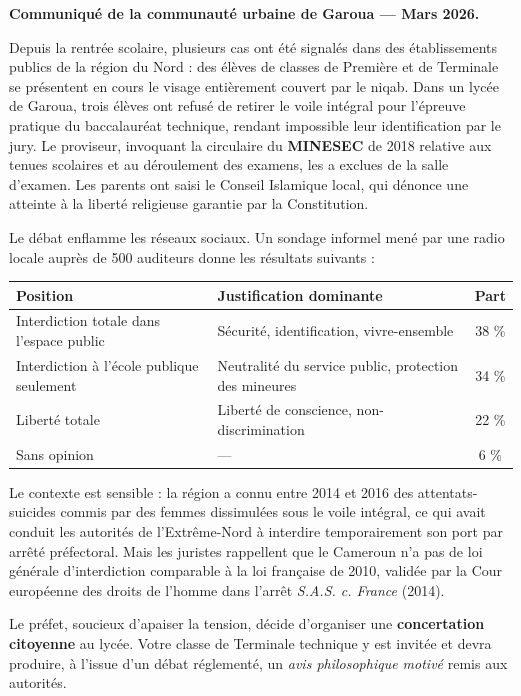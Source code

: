 \documentclass[11pt]{article}
\newcounter{popsec}
\newcounter{popsub}
\newcommand{\courssub}[1]{%
  \stepcounter{popsub}%
  \par\vspace{9pt}\noindent{\popxbold\fontsize{11.5}{13}\selectfont\color{popink}{\color{poporange}\thepopsec.\thepopsub}\hspace{6pt}#1}\par\nopagebreak\vspace{4pt}
}
\begin{document}
\courssub{Situation}

\textbf{Communiqué de la communauté urbaine de Garoua — Mars 2026.}

Depuis la rentrée scolaire, plusieurs cas ont été signalés dans des établissements publics de la région du Nord : des élèves de classes de Première et de Terminale se présentent en cours le visage entièrement couvert par le niqab. Dans un lycée de Garoua, trois élèves ont refusé de retirer le voile intégral pour l'épreuve pratique du baccalauréat technique, rendant impossible leur identification par le jury. Le proviseur, invoquant la circulaire du \textbf{MINESEC} de 2018 relative aux tenues scolaires et au déroulement des examens, les a exclues de la salle d'examen. Les parents ont saisi le Conseil Islamique local, qui dénonce une atteinte à la liberté religieuse garantie par la Constitution.

Le débat enflamme les réseaux sociaux. Un sondage informel mené par une radio locale auprès de 500 auditeurs donne les résultats suivants :

\begin{center}
\begin{tabularx}{\linewidth}{|l|X|c|}\hline
\rowcolor{popblueL} \textbf{Position} & \textbf{Justification dominante} & \textbf{Part} \\ \hline
Interdiction totale dans l'espace public & Sécurité, identification, vivre-ensemble & 38 \% \\ \hline
Interdiction à l'école publique seulement & Neutralité du service public, protection des mineures & 34 \% \\ \hline
Liberté totale & Liberté de conscience, non-discrimination & 22 \% \\ \hline
Sans opinion & --- & 6 \% \\ \hline
\end{tabularx}
\end{center}

Le contexte est sensible : la région a connu entre 2014 et 2016 des attentats-suicides commis par des femmes dissimulées sous le voile intégral, ce qui avait conduit les autorités de l'Extrême-Nord à interdire temporairement son port par arrêté préfectoral. Mais les juristes rappellent que le Cameroun n'a pas de loi générale d'interdiction comparable à la loi française de 2010, validée par la Cour européenne des droits de l'homme dans l'arrêt \emph{S.A.S. c. France} (2014).

Le préfet, soucieux d'apaiser la tension, décide d'organiser une \textbf{concertation citoyenne} au lycée. Votre classe de Terminale technique y est invitée et devra produire, à l'issue d'un débat réglementé, un \emph{avis philosophique motivé} remis aux autorités.
\end{document}
